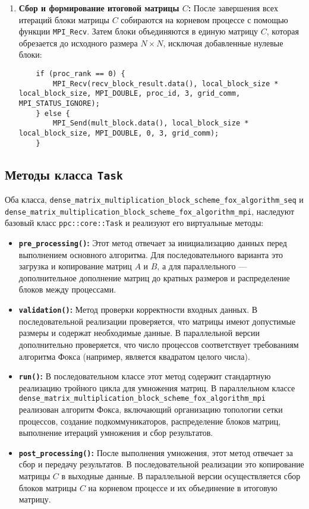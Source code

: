 \documentclass{report}
\begin{document}
\begin{enumerate}
    \item \textbf{Сбор и формирование итоговой матрицы $C$:}  
    После завершения всех итераций блоки матрицы $C$ собираются на корневом процессе с помощью функции \texttt{MPI\_Recv}. Затем блоки объединяются в единую матрицу $C$, которая обрезается до исходного размера $N \times N$, исключая добавленные нулевые блоки:
    \begin{lstlisting}
    if (proc_rank == 0) {
        MPI_Recv(recv_block_result.data(), local_block_size * local_block_size, MPI_DOUBLE, proc_id, 3, grid_comm, MPI_STATUS_IGNORE);
    } else {
        MPI_Send(mult_block.data(), local_block_size * local_block_size, MPI_DOUBLE, 0, 3, grid_comm);
    }
    \end{lstlisting}
\end{enumerate}

\subsection*{Методы класса \texttt{Task}}

Оба класса, \texttt{dense\_matrix\_multiplication\_block\_scheme\_fox\_algorithm\_seq} и \texttt{dense\_matrix\_multiplication\_block\_scheme\_fox\_algorithm\_mpi}, наследуют базовый класс \texttt{ppc::core::Task} и реализуют его виртуальные методы:

\begin{itemize}
    \item \textbf{\texttt{pre\_processing()}:} Этот метод отвечает за инициализацию данных перед выполнением основного алгоритма. Для последовательного варианта это загрузка и копирование матриц $A$ и $B$, а для параллельного — дополнительное дополнение матриц до кратных размеров и распределение блоков между процессами.
    
    \item \textbf{\texttt{validation()}:} Метод проверки корректности входных данных. В последовательной реализации проверяется, что матрицы имеют допустимые размеры и содержат необходимые данные. В параллельной версии дополнительно проверяется, что число процессов соответствует требованиям алгоритма Фокса (например, является квадратом целого числа).
    
    \item \textbf{\texttt{run()}:} В последовательном классе этот метод содержит стандартную реализацию тройного цикла для умножения матриц. В параллельном классе \texttt{dense\_matrix\_multiplication\_block\_scheme\_fox\_algorithm\_mpi} реализован алгоритм Фокса, включающий организацию топологии сетки процессов, создание подкоммуникаторов, распределение блоков матриц, выполнение итераций умножения и сбор результатов.
    
    \item \textbf{\texttt{post\_processing()}:} После выполнения умножения, этот метод отвечает за сбор и передачу результатов. В последовательной реализации это копирование матрицы $C$ в выходные данные. В параллельной версии осуществляется сбор блоков матрицы $C$ на корневом процессе и их объединение в итоговую матрицу.
\end{itemize}
\end{document}
